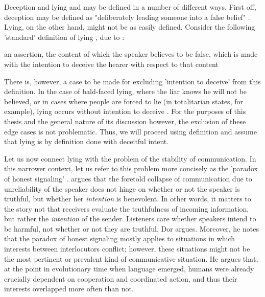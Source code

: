 Deception and lying and may be defined in a number of different ways.
First off, deception may be defined as "deliberately leading someone into a false belief" \citep[p.~358]{Meibauer18}.
Lying, on the other hand, might not be as easily defined. Consider the following 'standard' definition of lying \citep{Meibauer18}, due to \citet{Williams02}:
\begin{quoting}
    an assertion, the content of which the speaker believes to be false, which is made with the intention to deceive the hearer with respect to that content
\end{quoting}
There is, however, a case to be made for excluding 'intention to deceive' from this definition. In the case of bald-faced lying, where the liar knows he will not be believed, or in cases where people are forced to lie (in totalitarian states, for example), lying occurs without intention to deceive \citep[\S 1.5]{Saul12}.
For the purposes of this thesis and the general nature of its discussion however, the exclusion of these edge cases is not problematic. Thus, we will proceed using  definition and assume that lying is by definition done with deceitful intent.

Let us now connect lying with the problem of the stability of communication. In this narrower context, let us refer to this problem more concisely as the 'paradox of honest signaling' \citep[following][]{Dor17}.
\citet{Dor17} argues that the foretold collapse of communication due to unreliability of the speaker does not hinge on whether or not the speaker is truthful, but whether her \emph{intention} is benevolent.
In other words, it matters to the story not that receivers evaluate the truthfulness of incoming information, but rather the \emph{intention} of the sender. Listeners care whether speakers intend to be harmful, not whether or not they are truthful, Dor argues.
Moreover, he notes that the paradox of honest signaling mostly applies to situations in which interests between interlocutors conflict; however, these situations might not be the most pertinent or prevalent kind of communicative situation.
He argues that, at the point in evolutionary time when language emerged, humans were already crucially dependent on cooperation and coordinated action, and thus their interests overlapped more often than not.

